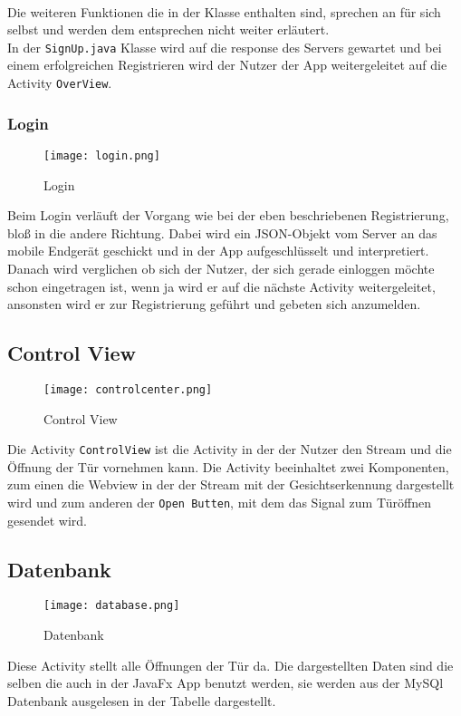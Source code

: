 \\
Die weiteren Funktionen die in der Klasse enthalten sind, sprechen an für sich selbst und werden dem entsprechen nicht weiter erläutert.
\\
In der \texttt{SignUp.java} Klasse wird auf die response des Servers gewartet und bei einem erfolgreichen Registrieren wird der Nutzer der App weitergeleitet auf die Activity \texttt{OverView}.

 
\subsubsection{Login}
\begin{figure}[h]
  \begin{center}
    \texttt{[image: login.png]}
  		  \caption{Login}
     \label{fig.Prozess}
  \end{center}
\end{figure}

Beim Login verläuft der Vorgang wie bei der eben beschriebenen Registrierung, bloß in die andere Richtung. Dabei wird ein JSON-Objekt vom Server an das mobile Endgerät geschickt und in der App aufgeschlüsselt und interpretiert. Danach wird verglichen ob sich der Nutzer, der sich gerade einloggen möchte schon eingetragen ist, wenn ja wird er auf die nächste Activity weitergeleitet, ansonsten wird er zur Registrierung geführt und gebeten sich anzumelden.
\subsection{Control View}
\begin{figure}[h]
  \begin{center}
    \texttt{[image: controlcenter.png]}
  		  \caption{Control View}
     \label{fig.Prozess}
  \end{center}
\end{figure}
Die Activity \texttt{ControlView} ist die Activity in der der Nutzer den Stream und die Öffnung der Tür vornehmen kann. Die Activity beeinhaltet zwei Komponenten, zum einen die Webview in der der Stream mit der Gesichtserkennung dargestellt wird und zum anderen der \texttt{Open Butten}, mit dem das Signal zum Türöffnen gesendet wird.

\newpage
\subsection{Datenbank}
\begin{figure}[h]
  \begin{center}
    \texttt{[image: database.png]}
  		  \caption{Datenbank}
     \label{fig.Prozess}
  \end{center}
\end{figure}
Diese Activity stellt alle Öffnungen der Tür da. Die dargestellten Daten sind die selben die auch in der JavaFx App benutzt werden, sie werden aus der MySQl Datenbank ausgelesen in der Tabelle dargestellt.